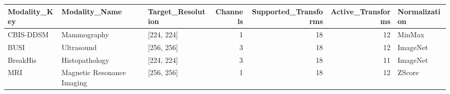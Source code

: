 \begin{tabular}{lllrrrl}
\toprule
Modality\_Key & Modality\_Name & Target\_Resolution & Channels & Supported\_Transforms & Active\_Transforms & Normalization \\
\midrule
CBIS-DDSM & Mammography & [224, 224] & 1 & 18 & 12 & MinMax \\
BUSI & Ultrasound & [256, 256] & 3 & 18 & 12 & ImageNet \\
BreakHis & Histopathology & [224, 224] & 3 & 18 & 11 & ImageNet \\
MRI & Magnetic Resonance Imaging & [256, 256] & 1 & 18 & 12 & ZScore \\
\bottomrule
\end{tabular}
